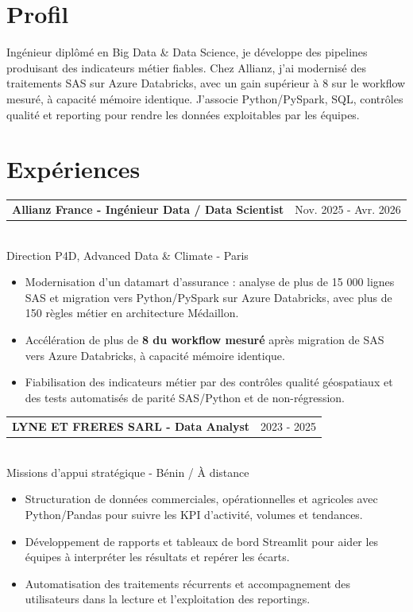 \documentclass[10pt,a4paper]{article}
\makeatletter
\newcommand{\role}[3]{%
  \vspace{3pt}
  \begin{tabularx}{\linewidth}{@{}Xr@{}}
  \textbf{#1} & {\color{muted}#2}
  \end{tabularx}\vspace{0.8pt}\\
  {\color{muted}#3}\par
  \vspace{3pt}
}
\makeatother
\begin{document}
\begin{lrbox}{\maincolumnbox}
\begin{minipage}[t]{0.695\textwidth}
\vspace{0pt}
\raggedright

\section{Profil}
Ingénieur diplômé en Big Data \& Data Science, je développe des pipelines produisant des indicateurs métier fiables. Chez Allianz, j'ai modernisé des traitements SAS sur Azure Databricks, avec un gain supérieur à 8\texttimes{} sur le workflow mesuré, à capacité mémoire identique. J'associe Python/PySpark, SQL, contrôles qualité et reporting pour rendre les données exploitables par les équipes.

\section{Expériences}
\role{Allianz France - Ingénieur Data / Data Scientist}{Nov. 2025 - Avr. 2026}{Direction P4D, Advanced Data \& Climate - Paris}
\begin{itemize}
  \item Modernisation d'un datamart d'assurance : analyse de plus de 15 000 lignes SAS et migration vers Python/PySpark sur Azure Databricks, avec plus de 150 règles métier en architecture Médaillon.
  \item Accélération de plus de \textbf{8\texttimes{} du workflow mesuré} après migration de SAS vers Azure Databricks, à capacité mémoire identique.
  \item Fiabilisation des indicateurs métier par des contrôles qualité géospatiaux et des tests automatisés de parité SAS/Python et de non-régression.
\end{itemize}

\vspace{8pt}
\role{LYNE ET FRERES SARL - Data Analyst}{2023 - 2025}{Missions d'appui stratégique - Bénin / À distance}
\begin{itemize}
  \item Structuration de données commerciales, opérationnelles et agricoles avec Python/Pandas pour suivre les KPI d'activité, volumes et tendances.
  \item Développement de rapports et tableaux de bord Streamlit pour aider les équipes à interpréter les résultats et repérer les écarts.
  \item Automatisation des traitements récurrents et accompagnement des utilisateurs dans la lecture et l'exploitation des reportings.
\end{itemize}


\end{minipage}
\end{lrbox}
\end{document}
